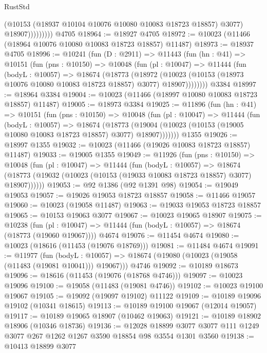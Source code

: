 \begin{lexlean}{RustStd}
\begin{coremodule}
                      (@10153 (@18937 @10104 @10076 @10080 @10083 @18723 @18857) @3077)
                      @18907)))))))))
    @4705
@18964 := @18927 @4705
@18972 := @10023 (@11466 (@18964 @10076 @10080 @10083 @18723 @18857) @11487)
@18973 := @18937 @4705
@18996 := @10241
    (fun (D : @2911) =>
    @11443
      (fun (hn : @41) =>
      @10151
        (fun (pns : @10150) =>
        @10048
          (fun (pl : @10047) =>
          @11444
            (fun (bodyL : @10057) =>
            @18674
              (@18773
                (@18972
                  (@10023 (@10153 (@18973 @10076 @10080 @10083 @18723 @18857) @3077) @18907))))))))
    @3384
@18997 := @18964 @3384
@19004 := @10023 (@11466 (@18997 @10080 @10083 @18723 @18857) @11487)
@19005 := @18973 @3384
@19025 := @11896
    (fun (hn : @41) =>
    @10151
      (fun (pns : @10150) =>
      @10048
        (fun (pl : @10047) =>
        @11444
          (fun (bodyL : @10057) =>
          @18674
            (@18773
              (@19004 (@10023 (@10153 (@19005 @10080 @10083 @18723 @18857) @3077) @18907)))))))
    @1355
@19026 := @18997 @1355
@19032 := @10023 (@11466 (@19026 @10083 @18723 @18857) @11487)
@19033 := @19005 @1355
@19049 := @11926
    (fun (pns : @10150) =>
    @10048
      (fun (pl : @10047) =>
      @11444
        (fun (bodyL : @10057) =>
        @18674 (@18773 (@19032 (@10023 (@10153 (@19033 @10083 @18723 @18857) @3077) @18907))))))
@19053 := @92 @1386 (@92 @1391 @98)
@19054 := @19049 @19053
@19057 := @19026 @19053 @18723 @18857
@19058 := @11466 @19057
@19060 := @10023 (@19058 @11487)
@19063 := @19033 @19053 @18723 @18857
@19065 := @10153 @19063 @3077
@19067 := @10023 @19065 @18907
@19075 := @10238
    (fun (pl : @10047) => @11444 (fun (bodyL : @10057) => @18674 (@18773 (@19060 @19067))))
    @4674
@19076 := @11454 @4674
@19080 := @10023 (@18616 (@11453 (@19076 @18769)))
@19081 := @11484 @4674
@19091 := @11977
    (fun (bodyL : @10057) => @18674 (@19080 (@10023 (@19058 (@11483 (@19081 @10041))) @19067)))
    @4746
@19092 := @10189 @18673
@19096 := @18616 (@11453 (@19076 (@18768 @4746)))
@19097 := @10023 @19096
@19100 := @19058 (@11483 (@19081 @4746))
@19102 := @10023 @19100 @19067
@19105 := @19092 (@19097 @19102) @11122
@19109 := @10189 @19096 @19102 (@10341 @18615)
@19113 := @10189 @19100 @19067 (@12014 @19057)
@19117 := @10189 @19065 @18907 (@10462 @19063)
@19121 := @10189 @18902 @18906 (@10346 @18736)
@19136 := @12028
    @18899
    @3077
    @3077
    @111
    @1249
    @3077
    @267
    @1262
    @1267
    @3590
    @18854
    @98
    @3554
    @1301
    @3560
@19138 := @10413 @18899 @3077

\end{coremodule}
\end{lexlean}
